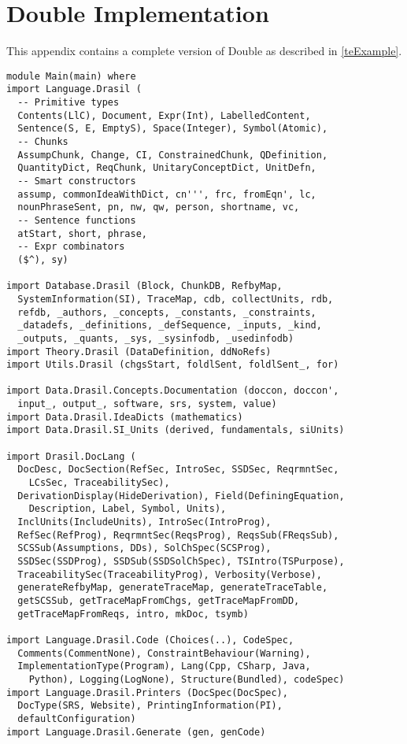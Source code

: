 \chapter{Double Implementation}\label{a:oldDouble}
This appendix contains a complete version of Double as described in \autoref{teExample}.
\begin{tcolorbox}[breakable, toprule at break=0pt, bottomrule at break=0pt]
\begin{verbatim}
module Main(main) where
import Language.Drasil (
  -- Primitive types
  Contents(LlC), Document, Expr(Int), LabelledContent,
  Sentence(S, E, EmptyS), Space(Integer), Symbol(Atomic),
  -- Chunks
  AssumpChunk, Change, CI, ConstrainedChunk, QDefinition,
  QuantityDict, ReqChunk, UnitaryConceptDict, UnitDefn,
  -- Smart constructors
  assump, commonIdeaWithDict, cn''', frc, fromEqn', lc,
  nounPhraseSent, pn, nw, qw, person, shortname, vc,
  -- Sentence functions
  atStart, short, phrase,
  -- Expr combinators
  ($^), sy)

import Database.Drasil (Block, ChunkDB, RefbyMap,
  SystemInformation(SI), TraceMap, cdb, collectUnits, rdb,
  refdb, _authors, _concepts, _constants, _constraints,
  _datadefs, _definitions, _defSequence, _inputs, _kind,
  _outputs, _quants, _sys, _sysinfodb, _usedinfodb)
import Theory.Drasil (DataDefinition, ddNoRefs)
import Utils.Drasil (chgsStart, foldlSent, foldlSent_, for)

import Data.Drasil.Concepts.Documentation (doccon, doccon',
  input_, output_, software, srs, system, value)
import Data.Drasil.IdeaDicts (mathematics)
import Data.Drasil.SI_Units (derived, fundamentals, siUnits)

import Drasil.DocLang (
  DocDesc, DocSection(RefSec, IntroSec, SSDSec, ReqrmntSec,
    LCsSec, TraceabilitySec),
  DerivationDisplay(HideDerivation), Field(DefiningEquation,
    Description, Label, Symbol, Units),
  InclUnits(IncludeUnits), IntroSec(IntroProg),
  RefSec(RefProg), ReqrmntSec(ReqsProg), ReqsSub(FReqsSub),
  SCSSub(Assumptions, DDs), SolChSpec(SCSProg),
  SSDSec(SSDProg), SSDSub(SSDSolChSpec), TSIntro(TSPurpose),
  TraceabilitySec(TraceabilityProg), Verbosity(Verbose),
  generateRefbyMap, generateTraceMap, generateTraceTable,
  getSCSSub, getTraceMapFromChgs, getTraceMapFromDD,
  getTraceMapFromReqs, intro, mkDoc, tsymb)

import Language.Drasil.Code (Choices(..), CodeSpec,
  Comments(CommentNone), ConstraintBehaviour(Warning),
  ImplementationType(Program), Lang(Cpp, CSharp, Java, 
    Python), Logging(LogNone), Structure(Bundled), codeSpec)
import Language.Drasil.Printers (DocSpec(DocSpec),
  DocType(SRS, Website), PrintingInformation(PI), 
  defaultConfiguration)
import Language.Drasil.Generate (gen, genCode)


\end{verbatim}
\end{tcolorbox}

